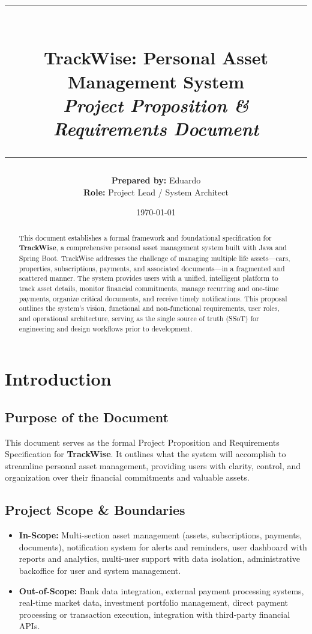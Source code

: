 \documentclass[11pt, a4paper]{article}
\title{
	\vspace{-15mm}
	\rule{\linewidth}{2pt} \\ [0.4cm]
	\LARGE \textbf{\color{PrimaryColor}TrackWise: Personal Asset Management System} \\
	\large \textit{\color{SecondaryColor}Project Proposition \& Requirements Document} \\ [0.2cm]
	\rule{\linewidth}{1pt}
}
\author{
	\textbf{Prepared by:} Eduardo \\
	\textbf{Role:} Project Lead / System Architect
}
\date{\today}
\begin{document}
	
	\maketitle
	
	\begin{abstract}
		\noindent This document establishes a formal framework and foundational specification for \textbf{TrackWise}, a comprehensive personal asset management system built with Java and Spring Boot. TrackWise addresses the challenge of managing multiple life assets—cars, properties, subscriptions, payments, and associated documents—in a fragmented and scattered manner. The system provides users with a unified, intelligent platform to track asset details, monitor financial commitments, manage recurring and one-time payments, organize critical documents, and receive timely notifications. This proposal outlines the system's vision, functional and non-functional requirements, user roles, and operational architecture, serving as the single source of truth (SSoT) for engineering and design workflows prior to development.
	\end{abstract}
	
	\thispagestyle{empty}
	\clearpage
	
	\tableofcontents
	\clearpage
	
	\section{Introduction}
	\subsection{Purpose of the Document}
	This document serves as the formal Project Proposition and Requirements Specification for \textbf{TrackWise}. It outlines what the system will accomplish to streamline personal asset management, providing users with clarity, control, and organization over their financial commitments and valuable assets.
	
	\subsection{Project Scope \& Boundaries}
	\begin{itemize}
		\item \textbf{In-Scope:} Multi-section asset management (assets, subscriptions, payments, documents), notification system for alerts and reminders, user dashboard with reports and analytics, multi-user support with data isolation, administrative backoffice for user and system management.
		\item \textbf{Out-of-Scope:} Bank data integration, external payment processing systems, real-time market data, investment portfolio management, direct payment processing or transaction execution, integration with third-party financial APIs.
	\end{itemize}
	
\end{document}

